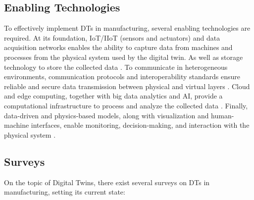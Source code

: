 \subsection{Enabling Technologies}
To effectively implement DTs in manufacturing, several enabling technologies are required. At its foundation, IoT/IIoT (sensors and actuators) and data acquisition networks enables the ability to capture data from machines and processes from the physical system used by the digital twin. As well as storage technology to store the collected data \cite{TAO2019653, Fuller9103025}. To communicate in heterogeneous environments, communication protocols and interoperability standards ensure reliable and secure data transmission between physical and virtual layers \cite{JONES202036}. Cloud and edge computing, together with big data analytics and AI, provide a computational infrastructure to process and analyze the collected data \cite{TAO2019653,Wang10090432}. Finally, data-driven and physics-based models, along with visualization and human-machine interfaces, enable monitoring, decision-making, and interaction with the physical system \cite{Rasheed8972429}.


 

\subsection{Surveys}
On the topic of Digital Twins, there exist several surveys on DTs in manufacturing, setting its current state: 

